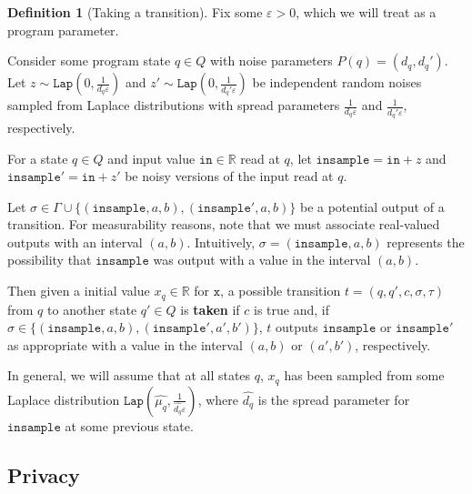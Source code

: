 \documentclass[12pt]{article}
\newcommand{\RR}{\mathbb{R}}
\newcommand{\Lap}{\texttt{Lap}}
\theoremstyle{definition}
\newtheorem{defn}[thm]{Definition}
\begin{document}
\begin{defn}[Taking a transition]
    Fix some $\varepsilon>0$, which we will treat as a program parameter.

    Consider some program state $q\in Q$ with noise parameters $P(q) = (d_q, d_q')$. Let $z\sim \Lap(0, \frac{1}{d_q\varepsilon})$ and $z'\sim\Lap(0, \frac{1}{d_q'\varepsilon})$ be independent random noises sampled from Laplace distributions with spread parameters $\frac{1}{d_q\varepsilon}$ and $\frac{1}{d_q'\varepsilon}$, respectively.

    For a state $q\in Q$ and input value $\texttt{in}\in \RR$ read at $q$, let $\texttt{insample} = \texttt{in}+z$ and $\texttt{insample}' = \texttt{in}+z'$ be noisy versions of the input read at $q$. 

    Let $\sigma\in \Gamma\cup\{(\texttt{insample}, a, b), (\texttt{insample}', a, b)\}$ be a potential output of a transition. For measurability reasons, note that we must associate real-valued outputs with an interval $(a, b)$. Intuitively, $\sigma = (\texttt{insample}, a, b)$ represents the possibility that $\texttt{insample}$ was output with a value in the interval $(a, b)$. 

    Then given a initial value $x_q\in \RR$ for $\texttt{x}$, a possible transition $t=(q, q', c, \sigma, \tau)$ from $q$ to another state $q'\in Q$ is \textbf{taken} if $c$ is true and, if $\sigma\in \{(\texttt{insample}, a, b), (\texttt{insample}', a', b')\}$, $t$ outputs $\texttt{insample}$ or $\texttt{insample}'$ as appropriate with a value in the interval $(a, b)$ or $(a', b')$, respectively. 
\end{defn}

In general, we will assume that at all states $q$, $x_q$ has been sampled from some Laplace distribution $\Lap(\hat{\mu_q}, \frac{1}{\hat{d_{q}}\varepsilon})$, where $\hat{d_{q}}$ is the spread parameter for $\texttt{insample}$ at some previous state. 

\subsection{Privacy}
\end{document}
